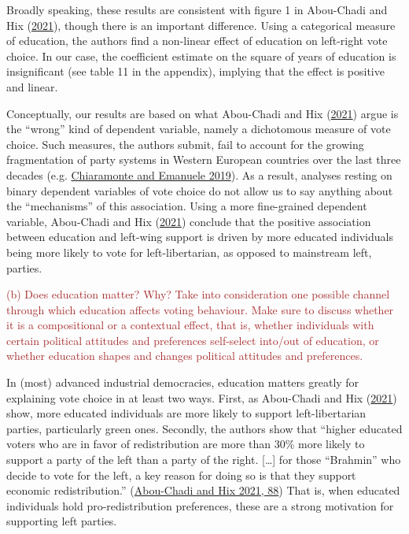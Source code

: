 \documentclass[
]{article}
\begin{document}
Broadly speaking, these results are consistent with figure 1 in
Abou-Chadi and Hix
(\protect\hyperlink{ref-abou-chadi_brahmin_2021}{2021}), though there is
an important difference. Using a categorical measure of education, the
authors find a non-linear effect of education on left-right vote choice.
In our case, the coefficient estimate on the square of years of
education is insignificant (see table 11 in the appendix), implying that
the effect is positive and linear.

Conceptually, our results are based on what Abou-Chadi and Hix
(\protect\hyperlink{ref-abou-chadi_brahmin_2021}{2021}) argue is the
``wrong'' kind of dependent variable, namely a dichotomous measure of
vote choice. Such measures, the authors submit, fail to account for the
growing fragmentation of party systems in Western European countries
over the last three decades (e.g.
\protect\hyperlink{ref-chiaramonte2019towards}{Chiaramonte and Emanuele
2019}). As a result, analyses resting on binary dependent variables of
vote choice do not allow us to say anything about the ``mechanisms'' of
this association. Using a more fine-grained dependent variable,
Abou-Chadi and Hix
(\protect\hyperlink{ref-abou-chadi_brahmin_2021}{2021}) conclude that
the positive association between education and left-wing support is
driven by more educated individuals being more likely to vote for
left-libertarian, as opposed to mainstream left, parties.

\textcolor{brown}{(b) Does education matter? Why? Take into consideration one possible channel through which education affects voting behaviour. Make sure to discuss whether it is a compositional or a contextual effect, that is, whether individuals with certain political attitudes and preferences self-select into/out of education, or whether education shapes and changes political attitudes and preferences.}

In (most) advanced industrial democracies, education matters greatly for
explaining vote choice in at least two ways. First, as Abou-Chadi and
Hix (\protect\hyperlink{ref-abou-chadi_brahmin_2021}{2021}) show, more
educated individuals are more likely to support left-libertarian
parties, particularly green ones. Secondly, the authors show that
``higher educated voters who are in favor of redistribution are more
than 30\% more likely to support a party of the left than a party of the
right. {[}\ldots{]} for those ``Brahmin'' who decide to vote for the
left, a key reason for doing so is that they support economic
redistribution.''
(\protect\hyperlink{ref-abou-chadi_brahmin_2021}{Abou-Chadi and Hix
2021, 88}) That is, when educated individuals hold pro-redistribution
preferences, these are a strong motivation for supporting left parties.
\end{document}
